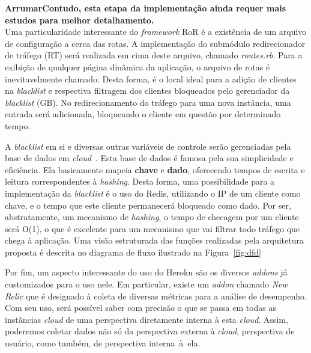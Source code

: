 \textbf{ArrumarContudo, esta etapa da implementação ainda requer mais estudos para melhor detalhamento.
}\\
Uma particularidade interessante do \emph{framework} RoR é a existência de um arquivo de configuração a cerca das rotas. A implementação do submódulo redirecionador de tráfego (RT) será realizada em cima deste arquivo, chamado \emph{routes.rb}. Para a exibição de qualquer página dinâmica da aplicação, o arquivo de rotas é inevitavelmente chamado. Desta forma, é o local ideal para a adição de clientes na \emph{blacklist} e respectiva filtragem dos clientes bloqueados pelo gerenciador da \emph{blacklist} (GB). No redirecionamento do tráfego para uma nova instância, uma entrada será adicionada, bloqueando o cliente em questão por determinado tempo.

A \emph{blacklist} em si e diversas outras variáveis de controle serão gerenciadas pela base de dados em \emph{cloud}~\cite{redis}. Esta base de dados é famosa pela sua simplicidade e eficiência. Ela basicamente mapeia \textbf{chave} e \textbf{dado}, oferecendo tempos de escrita e leitura correspondentes à \emph{hashing}. Desta forma, uma possibilidade para a implementação da \emph{blacklist} é o uso do Redis, utilizando o IP de um cliente como chave, e o tempo que este cliente permanecerá bloqueado como dado. Por ser, abstratamente, um mecanismo de \emph{hashing}, o tempo de checagem por um cliente será O(1), o que é excelente para um mecanismo que vai filtrar todo tráfego que chega à aplicação. Uma visão estruturada das funções realizadas pela arquitetura proposta é descrita no diagrama de fluxo ilustrado na Figura~\ref{fig:dfd}




Por fim, um aspecto interessante do uso do Heroku são os diversos \emph{addons} já customizados para o uso nele. Em particular, existe um \emph{addon} chamado \emph{New Relic} que é designado à coleta de diversas métricas para a análise de desempenho. Com seu uso, será possível saber com precisão o que se passa em todas as instâncias \emph{cloud} de uma perspectiva diretamente interna à esta \emph{cloud}. Assim, poderemos coletar dados não só da perspectiva externa à \emph{cloud}, perspectiva de usuário, como também, de perspectiva interna~à~ela.